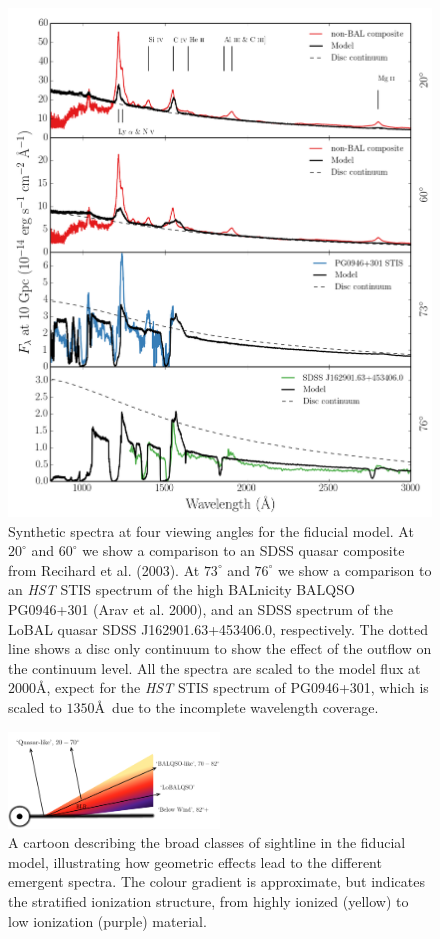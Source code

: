 \documentclass[useAMS,usenatbib]{mn2e_x}
\begin{document}
\begin{figure}
\centering
\includegraphics[width=1.0\textwidth]{figures/uvspec_new.png}
\caption
{
Synthetic spectra at four viewing angles for the fiducial model. At 
$20^\circ$ and $60^\circ$ we show a comparison to an SDSS quasar composite
from Recihard et al. (2003). At $73^\circ$ and $76^\circ$ we show a comparison to
an {\sl HST} STIS spectrum of the high BALnicity BALQSO 
PG0946+301 (Arav et al. 2000), and an SDSS spectrum of the LoBAL quasar 
SDSS J162901.63+453406.0, respectively. The dotted line shows a disc
only continuum to show the effect of the outflow on the continuum level. 
All the spectra are scaled to the model flux at $2000$\AA, expect for the 
{\sl HST} STIS spectrum of PG0946+301, which is scaled to $1350$\AA\
due to the incomplete wavelength coverage.
}
\label{fig:uvspec}
\end{figure}

\begin{figure} 
\centering
\includegraphics[width=0.5\textwidth]{figures/windnew3.png}
\caption
{
A cartoon describing the broad classes of sightline 
in the fiducial model, illustrating how geometric effects lead to 
the different emergent spectra. The colour gradient is approximate,
but indicates the stratified ionization structure, 
from highly ionized (yellow) to low ionization (purple) material.
}
\label{fig:sightline}
\end{figure} 
\end{document}
